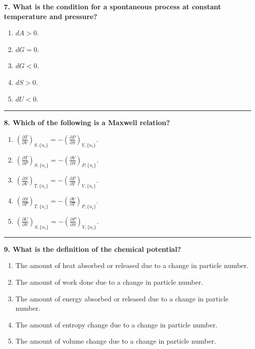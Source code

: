 \documentclass[
  9pt,
]{extbook}
\providecommand{\tightlist}{%
  \setlength{\itemsep}{0pt}\setlength{\parskip}{0pt}}
\theoremstyle{definition}
\theoremstyle{definition}
\theoremstyle{definition}
\theoremstyle{definition}
\theoremstyle{remark}
\begin{document}
\textbf{7. What is the condition for a spontaneous process at constant temperature and pressure?}

\begin{enumerate}
\def\labelenumi{\alph{enumi}.}
\tightlist
\item
  \(dA > 0\).
\item
  \(dG = 0\).
\item
  \(dG < 0\).
\item
  \(dS > 0\).
\item
  \(dU < 0\).
\end{enumerate}

\begin{center}\rule{0.5\linewidth}{0.5pt}\end{center}

\textbf{8. Which of the following is a Maxwell relation?}

\begin{enumerate}
\def\labelenumi{\alph{enumi}.}
\tightlist
\item
  \(\left(\frac{\partial T}{\partial V}\right)_{S,\{n_i\}} = -\left(\frac{\partial P}{\partial S}\right)_{V,\{n_i\}}\).
\item
  \(\left(\frac{\partial T}{\partial P}\right)_{S,\{n_i\}} = -\left(\frac{\partial V}{\partial S}\right)_{P,\{n_i\}}\).
\item
  \(\left(\frac{\partial S}{\partial V}\right)_{T,\{n_i\}} = -\left(\frac{\partial P}{\partial T}\right)_{V,\{n_i\}}\).
\item
  \(\left(\frac{\partial S}{\partial P}\right)_{T,\{n_i\}} = -\left(\frac{\partial V}{\partial T}\right)_{P,\{n_i\}}\).
\item
  \(\left(\frac{\partial U}{\partial V}\right)_{S,\{n_i\}} = -\left(\frac{\partial P}{\partial S}\right)_{V,\{n_i\}}\).
\end{enumerate}

\begin{center}\rule{0.5\linewidth}{0.5pt}\end{center}

\textbf{9. What is the definition of the chemical potential?}

\begin{enumerate}
\def\labelenumi{\alph{enumi}.}
\tightlist
\item
  The amount of heat absorbed or released due to a change in particle number.
\item
  The amount of work done due to a change in particle number.
\item
  The amount of energy absorbed or released due to a change in particle number.
\item
  The amount of entropy change due to a change in particle number.
\item
  The amount of volume change due to a change in particle number.
\end{enumerate}
\end{document}
